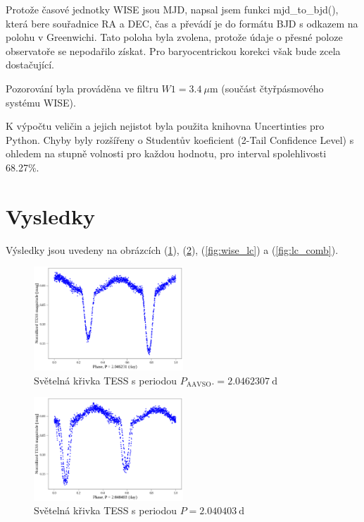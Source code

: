 \documentclass[a4paper,11pt,twocolumn]{article}
\begin{document}
            Protože časové jednotky WISE jsou MJD, napsal jsem funkci mjd\_to\_bjd(), která bere souřadnice RA a DEC, čas a převádí je do formátu BJD s odkazem na polohu v Greenwichi. Tato poloha byla zvolena, protože údaje o přesné poloze observatoře se nepodařilo získat. Pro baryocentrickou korekci však bude zcela dostačující.

            Pozorování byla prováděna ve filtru $W1 = 3.4 ~ \mu\text{m}$ (součást čtyřpásmového systému WISE). 
        
        \vspace{10pt}
        K výpočtu veličin a jejich nejistot byla použita knihovna Uncertinties pro Python. Chyby byly rozšířeny o Studentův koeficient (2-Tail Confidence Level) s ohledem na stupně volnosti pro každou hodnotu, pro interval spolehlivosti 68.27\%.

    \section{Vysledky}
        Výsledky jsou uvedeny na obrázcích (\ref{fig:tess_lc_1}), (\ref{fig:tess_lc_2}), (\ref{fig:wise_lc}) a (\ref{fig:lc_comb}).
        
        \begin{figure}
            \centering
            \includegraphics[width=0.5\textwidth]{tess_lc_1.png}
            \caption{Světelná křivka TESS s periodou $P_{\text{AAVSO}}. = 2.0462307 ~\text{d}$}
            \label{fig:tess_lc_1}
        \end{figure}

        \begin{figure}
            \centering
            \includegraphics[width=0.5\textwidth]{tess_lc_2.png}
            \caption{Světelná křivka TESS s periodou $P = 2.040403 ~\text{d}$}
            \label{fig:tess_lc_2}
        \end{figure}
\end{document}
